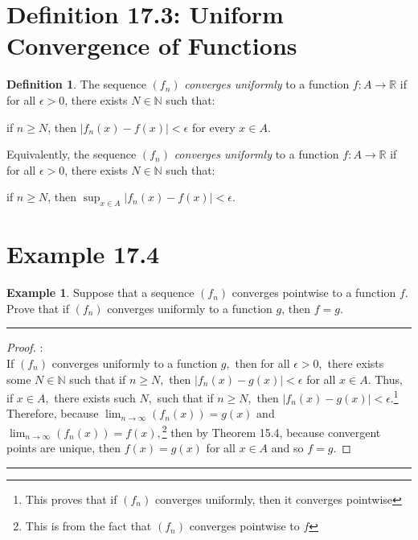\documentclass[openany, amssymb, psamsfonts]{amsart}
\newcommand{\bbN}{\mathbb{N}}
\newcommand{\bbR}{\mathbb{R}}
\newcommand{\abs}[1]{\lvert #1 \rvert}
\theoremstyle{definition}
\newtheorem{defn}{Definition}[section]
\newtheorem{exmp}{Example}[section]
\numberwithin{equation}{section}
\begin{document}
\section*{Definition 17.3: Uniform Convergence of Functions}
\begin{defn}
\label{17.3}
	The sequence $(f_n)$ \emph{converges uniformly} to a function $f\colon A \to \bbR$ if for all $\epsilon > 0$, there exists $N \in \bbN$ such that:
	\begin{center}
		if $ n \geq N$, \quad then $\abs{f_n(x) - f(x)} < \epsilon$ \quad for every $x \in A$.
	\end{center}
Equivalently, the sequence $(f_n)$ \emph{converges uniformly} to a function $f\colon A \to \bbR$ if for all $\epsilon > 0$, there exists $N \in \bbN$ such that:
	\begin{center}
		if $ n \geq N$, \quad then $\displaystyle \sup_{x\in A} \abs{f_n(x) - f(x)} < \epsilon$.
	\end{center}
\end{defn}

\section*{Example 17.4}
\begin{exmp} 
\label{17.4}
Suppose that a sequence $(f_n)$ converges pointwise to a function $f.$ Prove that if $(f_n)$ converges uniformly to a function $g$, then  $f=g.$
\end{exmp}
\vspace{4pt}     \hrule   \vspace{4pt}\begin{proof}:\\
If $(f_n)$ converges uniformly to a function $g,$ then for all $\epsilon>0,$ there exists some $N \in \bbN$ such that if $n\geq N,$ then $|f_n(x) - g(x)|< \epsilon$ for all $x \in A.$ Thus, if $x\in A,$ there exists such $N,$ such that if $n\geq N,$ then $|f_n(x) - g(x)|< \epsilon.$\footnote{This proves that if $(f_n)$ converges uniformly, then it converges pointwise} Therefore, because $\displaystyle\lim_{n\to \infty}(f_n(x)) = g(x)$ and $\displaystyle\lim_{n\to \infty }(f_n(x)) = f(x),$\footnote{This is from the fact that $(f_n)$ converges pointwise to $f$} then by Theorem 15.4, because convergent points are unique, then $f(x) = g(x)$ for all $x\in A$ and so $f = g.$
\end{proof}\vspace{4pt}     \hrule   \vspace{4pt}
\end{document}
